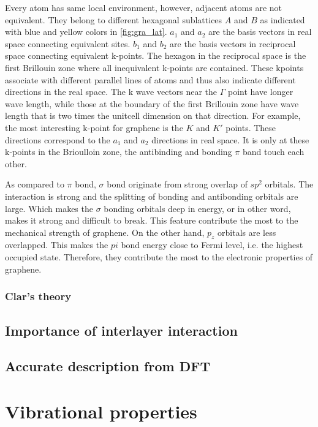 Every atom has same local environment, however, adjacent atoms are not equivalent. They belong to different hexagonal sublattices $A$ and $B$ as indicated with blue and yellow colors in \autoref{fig:gra_lat}. $a_1$ and $a_2$ are the basis vectors in real space connecting equivalent sites. $b_1$ and $b_2$ are the basis vectors in reciprocal space connecting equivalent k-points. The hexagon in the reciprocal space is the first Brillouin zone where all inequivalent k-points are contained. These kpoints associate with different parallel lines of atoms and thus also indicate different directions in the real space. The k wave vectors near the $\Gamma$ point have longer wave length, while those at the boundary of the first Brillouin zone have wave length that is two times the unitcell dimension on that direction. For example, the most interesting k-point for graphene is the $K$ and $K'$ points. These directions correspond to the $a_1$ and $a_2$ directions in real space. It is only at these k-points in the Brioulloin zone, the antibinding and bonding $\pi$ band touch each other. 



As compared to $\pi$ bond, $\sigma$ bond originate from strong overlap of $sp^2$ orbitals. The interaction is strong and the splitting of bonding and antibonding orbitals are large. Which makes the $\sigma$ bonding orbitals deep in energy, or in other word, makes it strong and difficult to break. This feature contribute the most to the mechanical strength of graphene. On the other hand, $p_z$ orbitals are less overlapped. This makes the $pi$ bond energy close to Fermi level, i.e. the highest occupied state. Therefore, they contribute the most to the electronic properties of graphene.  

\subsubsection{Clar’s theory}
\subsection{Importance of interlayer interaction}
\subsection{Accurate description from DFT}

\section{Vibrational properties}
